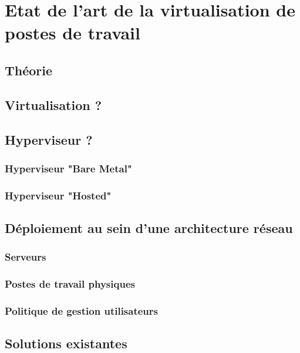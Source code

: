 \section{Etat de l'art de la virtualisation de postes de travail}

\subsection{Théorie}

\subsection{Virtualisation ?}

\subsection{Hyperviseur ?}

\subsubsection{Hyperviseur "Bare Metal"}

\subsubsection{Hyperviseur "Hosted"}


\subsection{Déploiement au sein d'une architecture réseau}

\subsubsection{Serveurs}

\subsubsection{Postes de travail physiques}

\subsubsection{Politique de gestion utilisateurs}

\subsection{Solutions existantes}

